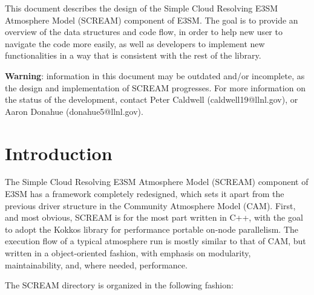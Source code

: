 \documentclass[10pt]{article}
\begin{document}
This document describes the design of the Simple Cloud Resolving E3SM Atmosphere Model (SCREAM)
component of E3SM. The goal is to provide an overview of the data structures and code
flow, in order to help new user to navigate the code more easily, as well as
developers to implement new functionalities in a way that is consistent with
the rest of the library.

\textbf{Warning}: information in this document may be outdated and/or incomplete,
as the design and implementation of SCREAM progresses. For more information on
the status of the development, contact Peter Caldwell (caldwell19@llnl.gov),
or Aaron Donahue (donahue5@llnl.gov).

\section{Introduction}
\label{sec:intro}
The Simple Cloud Resolving E3SM Atmosphere Model (SCREAM) component of
E3SM has a framework completely redesigned, which sets it apart from
the previous driver structure in the Community Atmosphere Model (CAM).
First, and most obvious, SCREAM is for the most part written in C++,
with the goal to adopt the Kokkos library for performance portable
on-node parallelism. The execution flow of a typical atmosphere run is
mostly similar to that of CAM, but written in a object-oriented fashion,
with emphasis on modularity, maintainability, and, where needed, performance.

The SCREAM directory is organized in the following fashion:
\end{document}
